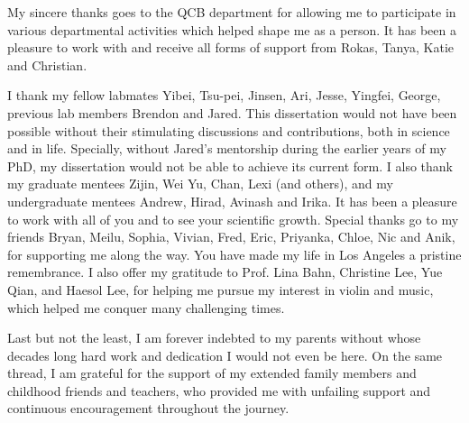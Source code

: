 My sincere thanks goes to the QCB department for allowing me to participate in various departmental activities which helped shape me as a person. It has been a pleasure to work with and receive all forms of support from Rokas, Tanya, Katie and Christian.

I thank my fellow labmates Yibei, Tsu-pei, Jinsen, Ari, Jesse, Yingfei, George, previous lab members Brendon and Jared. This dissertation would not have been possible without their stimulating discussions and contributions, both in science and in life. Specially, without Jared's mentorship during the earlier years of my PhD, my dissertation would not be able to achieve its current form. I also thank my graduate mentees Zijin, Wei Yu, Chan, Lexi (and others), and my undergraduate mentees Andrew, Hirad, Avinash and Irika. It has been a pleasure to work with all of you and to see your scientific growth. 
Special thanks go to my friends Bryan, Meilu, Sophia, Vivian, Fred, Eric, Priyanka, Chloe, Nic and Anik, for supporting me along the way. You have made my life in Los Angeles a pristine remembrance. I also offer my gratitude to Prof. Lina Bahn, Christine Lee, Yue Qian, and Haesol Lee, for helping me pursue my interest in violin and music, which helped me conquer many challenging times.

Last but not the least, I am forever indebted to my parents without whose decades long hard work and dedication I would not even be here. On the same thread, I am grateful for the support of my extended family members and childhood friends and teachers, who provided me with unfailing support and continuous encouragement throughout the journey.